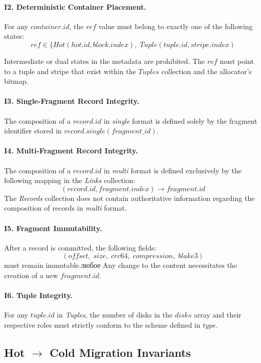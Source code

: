 \documentclass[a4paper,12pt]{article}
\begin{document}
    \paragraph{I2. Deterministic Container Placement.}
    For any $container.id$, the $ref$ value must belong to exactly one of the following states:
    \[
        ref \in \{ Hot(hot.id, block.index),\; Tuple(tuple.id, stripe.index)
    \]

    Intermediate or dual states in the metadata are prohibited. The $ref$ must point to a tuple and stripe that exist within the $Tuples$ collection and the allocator's bitmap.

    \paragraph{I3. Single-Fragment Record Integrity.}
    The composition of a $record.id$ in \textit{single} format is defined solely by the fragment identifier stored in $record.single(fragment\_id)$.

    \paragraph{I4. Multi-Fragment Record Integrity.}
    The composition of a $record.id$ in \textit{multi} format is defined exclusively by the following mapping in the \textit{Links} collection:
    \[
        (record.id, fragment.index) \rightarrow fragment.id
    \]
    The \textit{Records} collection does not contain authoritative information regarding the composition of records in \textit{multi} format.

    \paragraph{I5. Fragment Immutability.}
    After a record is committed, the following fields:
    \[
        (offset,\; size,\; crc64,\; compression,\; blake3)
    \]
    must remain immutable.любое Any change to the content necessitates the creation of a new $fragment.id$.

    \paragraph{I6. Tuple Integrity.}
    For any $tuple.id$ in \textit{Tuples}, the number of disks in the $disks$ array and their respective roles must strictly conform to the scheme defined in $type$.

    \subsection{Hot $\rightarrow$ Cold Migration Invariants}
\end{document}
